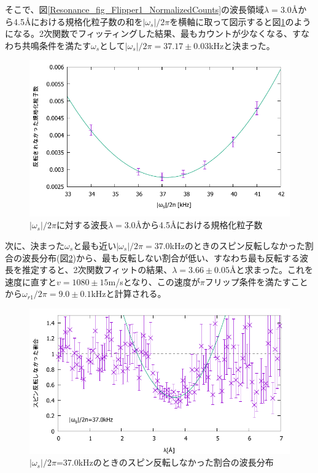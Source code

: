 そこで、図\ref{Resonance_fig_Flipper1_NormalizedCounts}の波長領域$\lambda=$3.0{\AA}から4.5{\AA}における規格化粒子数の和を$|\omega_s|/2\pi$を横軸に取って図示すると図\ref{Resonance_fig_Flipper1_Freq}のようになる。2次関数でフィッティングした結果、最もカウントが少なくなる、すなわち共鳴条件を満たす$\omega_s$として$|\omega_s|/2\pi=37.17\pm0.03$kHzと決まった。

\begin{figure}[h]
\centering
\includegraphics[width=12cm]{resonance/analysis/Flipper1_Freq_30-45r.pdf}
\caption{$|\omega_s|/2\pi$に対する波長$\lambda=$3.0{\AA}から4.5{\AA}における規格化粒子数}\label{Resonance_fig_Flipper1_Freq}
\end{figure}

次に、決まった$\omega_s$と最も近い$|\omega_s|/2\pi=37.0$kHzのときのスピン反転しなかった割合の波長分布(図\ref{Resonance_fig_Flipper1_CountsRate_370fit})から、最も反転しない割合が低い、すなわち最も反転する波長を推定すると、2次関数フィットの結果、$\lambda=3.66\pm0.05${\AA}と求まった。これを速度に直すと$v=1080\pm15$m/sとなり、この速度が$\pi$フリップ条件を満たすことから$\omega_{r1}/2\pi=9.0\pm0.1$kHzと計算される。
\begin{figure}[h]
\centering
\includegraphics[width=12cm]{resonance/analysis/Flipper1_CountsRate_370kHz_fit.pdf}
\caption{$|\omega_s|/2\pi$=37.0kHzのときのスピン反転しなかった割合の波長分布}\label{Resonance_fig_Flipper1_CountsRate_370fit}
\end{figure}

